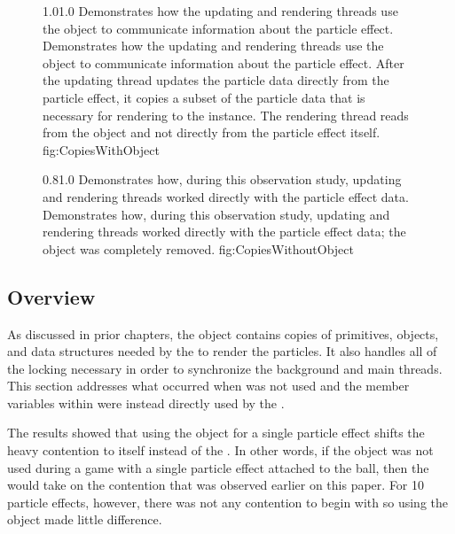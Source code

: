 \begin{figure}
\addtocounter{figure}{-1}

	\centering
	{1.0}{1.0}
	{Demonstrates how the updating and rendering threads use the \newline {} object to communicate information about the particle effect.}
	{Demonstrates how the updating and rendering threads use the  object to communicate information about the particle effect. After the updating thread updates the particle data directly from the particle effect, it copies a subset of the particle data that is necessary for rendering to the  instance. The rendering thread reads from the  object and not directly from the particle effect itself.}
	{fig:CopiesWithObject}
	
	{0.8}{1.0}
	{Demonstrates how, during this observation study, updating and rendering threads worked directly with the particle effect data.}
	{Demonstrates how, during this observation study, updating and rendering threads worked directly with the particle effect data; the  object was completely removed.}
	{fig:CopiesWithoutObject}
\end{figure}

\subsection{Overview}\label{ssec:observe_copies_overview}

As discussed in prior chapters, the  object contains copies of primitives, objects, and data structures needed by the  to render the particles. It also handles all of the locking necessary in order to synchronize the background and main threads. This section addresses what occurred when  was not used and the member variables within  were instead directly used by the . 

The results showed that using the  object for a single particle effect shifts the heavy contention to itself instead of the . In other words, if the  object was not used during a game with a single particle effect attached to the ball, then the  would take on the contention that was observed earlier on this paper. For 10 particle effects, however, there was not any contention to begin with so using the  object made little difference.

